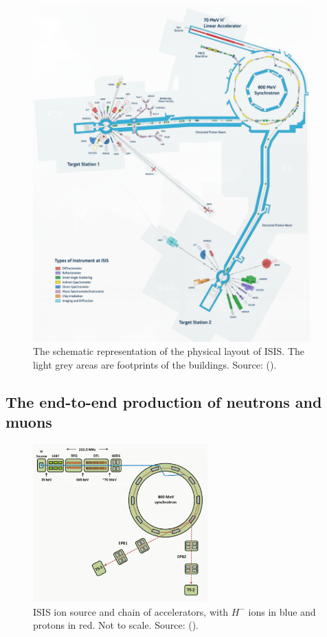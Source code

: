 \documentclass[10pt,oneside]{report}
\begin{document}
\begin{figure}[htbp]
    \centering
    \includegraphics[width=0.95\textwidth]{ISIS.png}
    \caption{The schematic representation of the physical layout of ISIS. The light grey areas are footprints of the buildings. Source: (\citet{thomason2019isis}).}\label{fig:isis}
\end{figure}

\subsection{The end-to-end production of neutrons and muons}
\begin{figure}[htbp]
    \centering
    \includegraphics[width=0.6\textwidth]{ISIS2.png}
    \caption{ISIS ion source and chain of accelerators, with $H^-$ ions in blue and protons in red. Not to scale. Source: (\citet{2021practicalguide}).}\label{fig:isis2}
\end{figure}
\end{document}

